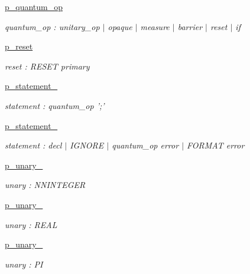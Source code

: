 \begin{DoxyCompactItemize}
\hyperlink{namespaceqat_1_1interop_1_1qasm__parser_1_1OqasmParser_1_1p__quantum__op}{p\-\_\-quantum\-\_\-op}
\begin{DoxyCompactList}\small\item\em quantum\-\_\-op \-: unitary\-\_\-op $|$ opaque $|$ measure $|$ barrier $|$ reset $|$ if \end{DoxyCompactList}\item 
\hyperlink{namespaceqat_1_1interop_1_1qasm__parser_1_1OqasmParser_1_1p__reset}{p\-\_\-reset}
\begin{DoxyCompactList}\small\item\em reset \-: R\-E\-S\-E\-T primary \end{DoxyCompactList}\item 
\hyperlink{namespaceqat_1_1interop_1_1qasm__parser_1_1OqasmParser_1_1p__statement__0}{p\-\_\-statement\-\_}
\begin{DoxyCompactList}\small\item\em statement \-: quantum\-\_\-op ';' \end{DoxyCompactList}\item 
\hyperlink{namespaceqat_1_1interop_1_1qasm__parser_1_1OqasmParser_1_1p__statement__1}{p\-\_\-statement\-\_}
\begin{DoxyCompactList}\small\item\em statement \-: decl $|$ I\-G\-N\-O\-R\-E $|$ quantum\-\_\-op error $|$ F\-O\-R\-M\-A\-T error \end{DoxyCompactList}\item 
\hyperlink{namespaceqat_1_1interop_1_1qasm__parser_1_1OqasmParser_1_1p__unary__0}{p\-\_\-unary\-\_}
\begin{DoxyCompactList}\small\item\em unary \-: N\-N\-I\-N\-T\-E\-G\-E\-R \end{DoxyCompactList}\item 
\hyperlink{namespaceqat_1_1interop_1_1qasm__parser_1_1OqasmParser_1_1p__unary__1}{p\-\_\-unary\-\_}
\begin{DoxyCompactList}\small\item\em unary \-: R\-E\-A\-L \end{DoxyCompactList}\item 
\hyperlink{namespaceqat_1_1interop_1_1qasm__parser_1_1OqasmParser_1_1p__unary__2}{p\-\_\-unary\-\_}
\begin{DoxyCompactList}\small\item\em unary \-: P\-I \end{DoxyCompactList}\item 

\end{DoxyCompactItemize}
